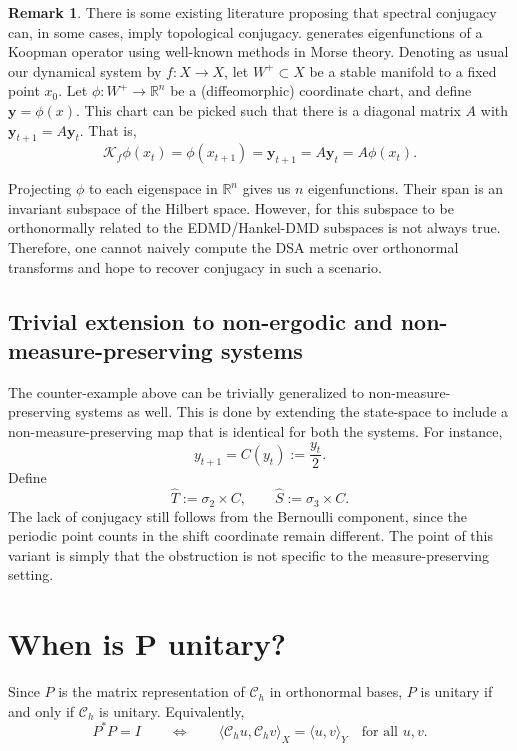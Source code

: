 \documentclass{article}
\theoremstyle{definition}
\newtheorem{remark}{Remark}
\begin{document}
 \begin{remark}There is some existing literature proposing that spectral conjugacy can, in some cases, imply topological conjugacy. \citep{mezic2020spectrum} generates eigenfunctions of a Koopman operator using well-known methods in Morse theory. Denoting as usual our dynamical system by $f:X\xrightarrow{} X$, let $W^+\subset X$ be a stable manifold to a fixed point $x_0$. Let $\phi:W^+ \xrightarrow{} \mathbb{R}^n$ be a (diffeomorphic) coordinate chart, and define $\textbf{y} = \phi(x)$. This chart can be picked such that there is a diagonal matrix $A$ with $\textbf{y}_{t+1} = A\textbf{y}_t$. That is, 
 \begin{equation*}
         \mathcal{K}_f\phi(x_t) = \phi(x_{t+1}) = \textbf{y}_{t+1} = A\textbf{y}_{t}= A\phi(x_{t}).
 \end{equation*}

 Projecting $\phi$ to each eigenspace in $\mathbb{R}^n$ gives us $n$ eigenfunctions. Their span is an invariant subspace of the Hilbert space. However, for this subspace to be orthonormally related to the EDMD/Hankel-DMD subspaces is not always true. Therefore, one cannot naively compute the DSA metric over orthonormal transforms and hope to recover conjugacy in such a scenario. 


 \end{remark}

\subsection{Trivial extension to non-ergodic and non-measure-preserving systems}
\label{app:nmp_variant}

The counter-example above can be trivially generalized to non-measure-preserving systems as well. This is done by extending the state-space to include a non-measure-preserving map that is identical for both the systems. For instance,
\[
y_{t+1} = C(y_t):=\frac{y_t}{2}.
\]
Define
\[
\widehat T:=\sigma_2\times C,
\qquad
\widehat S:=\sigma_3\times C.
\]
The lack of conjugacy still follows from the Bernoulli component, since the periodic point counts in the shift coordinate remain different. The point of this variant is simply that the obstruction is not specific to the measure-preserving setting.



\section{When is P unitary?} \label{app:when_is_P_unitary?}
Since \(P\) is the matrix representation of \(\mathcal{C}_h\) in orthonormal bases, \(P\) is unitary if and only if \(\mathcal{C}_h\) is unitary. Equivalently,
\begin{equation}
    P^*P = I
    \qquad \Longleftrightarrow \qquad
    \langle \mathcal{C}_h u,\mathcal{C}_h v\rangle_X = \langle u,v\rangle_Y
    \quad \text{for all } u,v.
\end{equation}
\end{document}
